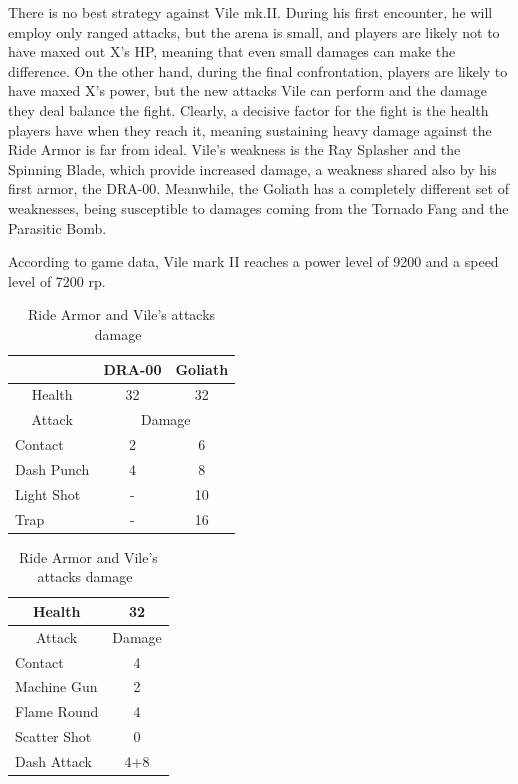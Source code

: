 There is no best strategy against Vile mk.II. During his first encounter, he will employ only ranged attacks, but the arena is small, and players are likely not to have maxed out X's HP, meaning that even small damages can make the difference. On the other hand, during the final confrontation, players are likely to have maxed X's power, but the new attacks Vile can perform and the damage they deal balance the fight. Clearly, a decisive factor for the fight is the health players have when they reach it, meaning sustaining heavy damage against the Ride Armor is far from ideal. Vile's weakness is the Ray Splasher and the Spinning Blade, which provide increased damage, a weakness shared also by his first armor, the DRA-00. Meanwhile, the Goliath has a completely different set of weaknesses, being susceptible to damages coming from the Tornado Fang and the Parasitic Bomb.

According to game data, Vile mark II reaches a power level of 9200 and a speed level of 7200 rp.


\begin{table}[htp] 
	\centering
	\begin{minipage}{.47\linewidth}
		\centering
		\begin{tabular}[h]{l c c}
			&\multicolumn{1}{c}{DRA-00} &\multicolumn{1}{c}{Goliath}  \\
			\toprule
			\multicolumn{1}{c}{Health}  & 32 &32 \\
			\midrule
			\multicolumn{1}{c}{Attack} & \multicolumn{2}{c}{Damage}\\
			Contact & 2& 6\\
			Dash Punch& 4&8\\
			Light Shot& -&10\\
			Trap& -&16\\
			\bottomrule
		\end{tabular}
	\end{minipage}
	\begin{minipage}{.45\linewidth}
		\centering
		\begin{tabular}[h]{l c}
			\toprule
			\multicolumn{1}{c}{Health}  & 32 \\
			\midrule
			\multicolumn{1}{c}{Attack} & \multicolumn{1}{c}{Damage}\\
			Contact & 4 \\
			Machine Gun & 2\\
			Flame Round & 4\\
			Scatter Shot& 0\\
			Dash Attack& 4+8\\
			\bottomrule
		\end{tabular}
	\end{minipage}
	\caption{Ride Armor and Vile's attacks damage~\cite{wiki:Vile2,book:Compendium}}
\end{table}


